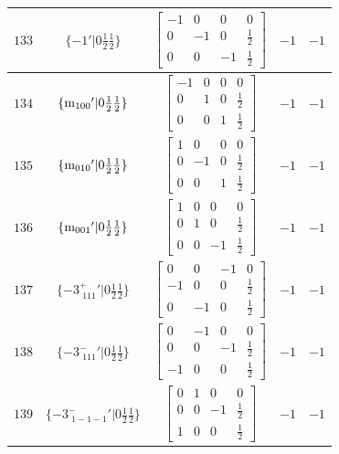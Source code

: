 \documentclass[fleqn,8pt]{jsarticle}
\begin{document}
\begin{longtable}{ccccc}
$ 133 $ & $ \{-1{}'|0 \frac{1}{2} \frac{1}{2}\} $ & $ \begin{bmatrix} -1 & 0 & 0 & 0 \\ 0 & -1 & 0 & \frac{1}{2} \\ 0 & 0 & -1 & \frac{1}{2} \end{bmatrix} $ & $ -1 $ & $ -1 $ \\ \hline
$ 134 $ & $ \{{\rm m}_{100}{}'|0 \frac{1}{2} \frac{1}{2}\} $ & $ \begin{bmatrix} -1 & 0 & 0 & 0 \\ 0 & 1 & 0 & \frac{1}{2} \\ 0 & 0 & 1 & \frac{1}{2} \end{bmatrix} $ & $ -1 $ & $ -1 $ \\ \hline
$ 135 $ & $ \{{\rm m}_{010}{}'|0 \frac{1}{2} \frac{1}{2}\} $ & $ \begin{bmatrix} 1 & 0 & 0 & 0 \\ 0 & -1 & 0 & \frac{1}{2} \\ 0 & 0 & 1 & \frac{1}{2} \end{bmatrix} $ & $ -1 $ & $ -1 $ \\ \hline
$ 136 $ & $ \{{\rm m}_{001}{}'|0 \frac{1}{2} \frac{1}{2}\} $ & $ \begin{bmatrix} 1 & 0 & 0 & 0 \\ 0 & 1 & 0 & \frac{1}{2} \\ 0 & 0 & -1 & \frac{1}{2} \end{bmatrix} $ & $ -1 $ & $ -1 $ \\ \hline
$ 137 $ & $ \{-3^{+}_{\,\,111}{}'|0 \frac{1}{2} \frac{1}{2}\} $ & $ \begin{bmatrix} 0 & 0 & -1 & 0 \\ -1 & 0 & 0 & \frac{1}{2} \\ 0 & -1 & 0 & \frac{1}{2} \end{bmatrix} $ & $ -1 $ & $ -1 $ \\ \hline
$ 138 $ & $ \{-3^{-}_{\,\,111}{}'|0 \frac{1}{2} \frac{1}{2}\} $ & $ \begin{bmatrix} 0 & -1 & 0 & 0 \\ 0 & 0 & -1 & \frac{1}{2} \\ -1 & 0 & 0 & \frac{1}{2} \end{bmatrix} $ & $ -1 $ & $ -1 $ \\ \hline
$ 139 $ & $ \{-3^{-}_{\,\,1-1-1}{}'|0 \frac{1}{2} \frac{1}{2}\} $ & $ \begin{bmatrix} 0 & 1 & 0 & 0 \\ 0 & 0 & -1 & \frac{1}{2} \\ 1 & 0 & 0 & \frac{1}{2} \end{bmatrix} $ & $ -1 $ & $ -1 $ \\ \hline

\end{longtable}
\end{document}
